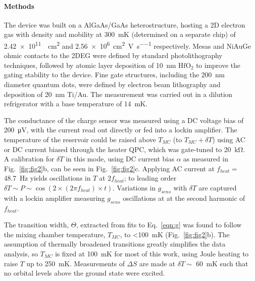 \documentclass[twocolumn,showpacs,amsmath,amssymb,prl,aps,superscriptaddress]{revtex4-1}
\begin{document}
\paragraph*{Methods} The device was built on a AlGaAs/GaAs heterostructure, hosting a 2D electron gas with density and mobility at \SI{300}{\milli\kelvin} (determined on a separate chip) of \SI{2.42e11}{\per\square\centi\metre} and \SI[per-mode=symbol]{2.56e6}{\square\centi\metre\per\volt\per\second} respectively.   Mesas and NiAuGe ohmic contacts to the 2DEG were defined by standard photolithography techniques, followed by atomic layer deposition of \SI{10}{\nano\metre} $\mathrm{HfO_2}$ to improve the gating stability to the device. Fine gate structures, including the \SI{200}{\nano\metre} diameter quantum dots, were defined by electron beam lithography and deposition of \SI{20}{\nano\metre} Ti/Au. The measurement was carried out in a dilution refrigerator with a base temperature of \SI{14}{\milli\kelvin}.

The conductance of the charge sensor was measured using a DC voltage bias of \SI{200}{\micro\volt}, with the current read out directly or fed into a lockin amplifier.  The temperature of the reservoir could be raised above $T_{MC}$ (to $T_{MC} + \delta T$) using AC or DC current biased through the heater QPC, which was gate-tuned to \SI{20}{\kilo\ohm}. A calibration for $\delta T$ in this mode, using DC current bias $\alpha$ as measured in Fig.~\ref{fig:fig2}b, can be seen in Fig.~\ref{fig:fig2}c. Applying AC current at $f_{heat} =$ \SI{48.7}{\hertz} yields oscillations in $T$ at $2f_{heat}$; to leading order $\delta T \sim P \sim \cos(2 \times (2 \pi f_{heat}) \times t)$. Variations in $g_{sens}$ with $\delta T$ are captured with a lockin amplifier measuring $g_{sens}$ oscillations at at the second harmonic of $f_{heat}$.

The transition width, $\Theta$, extracted from fits to Eq.~\ref{eqn:g} was found to follow the mixing chamber temperature, $T_{MC}$, to \SI{<100}{\milli\kelvin} (Fig.~\ref{fig:fig2}b). The assumption of thermally broadened transitions greatly simplifies the data analysis, so $T_{MC}$ is fixed at \SI{100}{\milli\kelvin} for most of this work, using Joule heating to raise $T$ up to \SI{250}{\milli\kelvin}. Measurements of $\Delta S$ are made at $\delta T \sim $ \SI{60}{\milli\kelvin} such that no orbital levels above the ground state were excited.


{}

\end{document}
